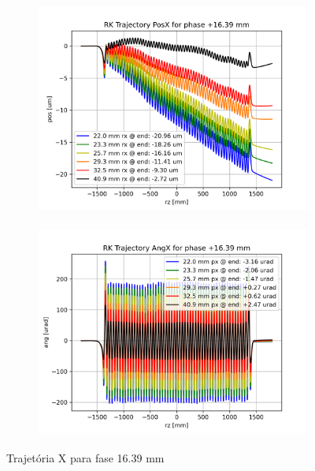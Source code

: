 \documentclass[a4paper,12pt]{article}
\begin{document}
\begin{figure}[H]
\begin{subfigure}{0.5\textwidth}
\includegraphics[width=0.9\linewidth, height=7cm]{figs/phase16 RK Posx.png} 
\label{fig:subim116tx}
\end{subfigure}
\begin{subfigure}{0.5\textwidth}
\includegraphics[width=0.9\linewidth, height=7cm]{figs/phase16 RK Angx.png}
\label{fig:subim216tx}
\end{subfigure}
\caption{Trajetória X para fase 16.39 mm}
\label{fig:trajx_16}
\end{figure}
\end{document}
